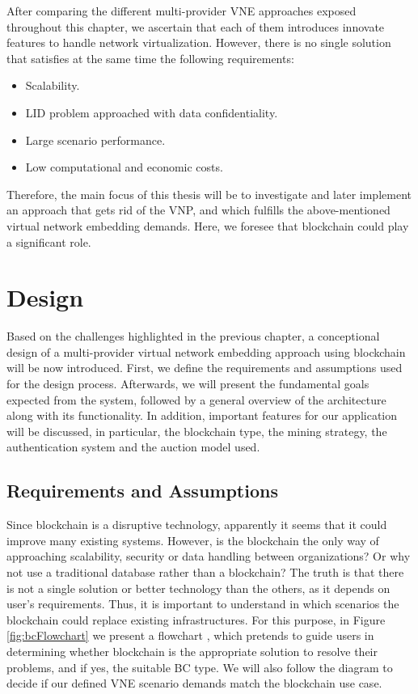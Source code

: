 After comparing the different multi-provider VNE approaches exposed throughout this chapter, we ascertain that each of them introduces innovate features to handle network virtualization. However, there is no single solution that satisfies at the same time the following requirements:

\begin{itemize}
	\item Scalability.
	\item LID problem approached with data confidentiality.
	\item Large scenario performance.
	\item Low computational and economic costs.
\end{itemize}

Therefore, the main focus of this thesis will be to investigate and later implement an approach that gets rid of the VNP, and which fulfills the above-mentioned virtual network embedding demands. Here, we foresee that blockchain could play a significant role.


\chapter{Design}
\label{ch:design}

Based on the challenges highlighted in the previous chapter, a conceptional design of a multi-provider virtual network embedding approach using blockchain will be now introduced. First, we define the requirements and assumptions used for the design process. Afterwards, we will present the fundamental goals expected from the system, followed by a general overview of the architecture along with its functionality. In addition, important features for our application will be discussed, in particular, the blockchain type, the mining strategy, the authentication system and the auction model used.

\section{Requirements and Assumptions} \label{requirements}

Since blockchain is a disruptive technology, apparently it seems that it could improve many existing systems. However, is the blockchain the only way of approaching scalability, security or data handling between organizations? Or why not use a traditional database rather than a blockchain? The truth is that there is not a single solution or better technology than the others, as it depends on user's requirements. Thus, it is important to understand in which scenarios the blockchain could replace existing infrastructures. For this purpose, in Figure \ref{fig:bcFlowchart} we present a flowchart \citep{wust2017you}, which pretends to guide users in determining whether blockchain is the appropriate solution to resolve their problems, and if yes, the suitable BC type. We will also follow the diagram to decide if our defined VNE scenario demands match the blockchain use case.


